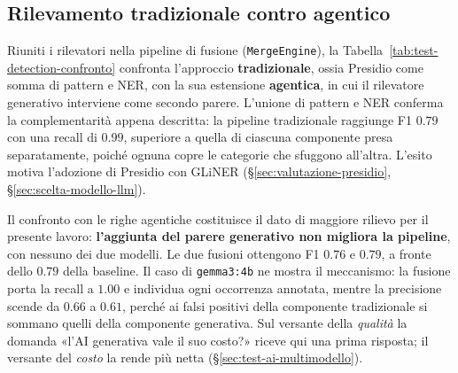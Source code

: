 \subsection{Rilevamento tradizionale contro agentico}
\label{sub:test-trad-vs-ai}

Riuniti i rilevatori nella pipeline di fusione (\texttt{MergeEngine}), la Tabella~\ref{tab:test-detection-confronto} confronta l'approccio \textbf{tradizionale}, ossia Presidio come somma di pattern e NER, con la sua estensione \textbf{agentica}, in cui il rilevatore generativo interviene come secondo parere. L'unione di pattern e NER conferma la complementarità appena descritta: la pipeline tradizionale raggiunge F1 $0.79$ con una recall di $0.99$, superiore a quella di ciascuna componente presa separatamente, poiché ognuna copre le categorie che sfuggono all'altra. L'esito motiva l'adozione di Presidio con GLiNER (§\ref{sec:valutazione-presidio}, §\ref{sec:scelta-modello-llm}).

Il confronto con le righe agentiche costituisce il dato di maggiore rilievo per il presente lavoro: \textbf{l'aggiunta del parere generativo non migliora la pipeline}, con nessuno dei due modelli. Le due fusioni ottengono F1 $0.76$ e $0.79$, a fronte dello $0.79$ della baseline. Il caso di \texttt{gemma3:4b} ne mostra il meccanismo: la fusione porta la recall a $1.00$ e individua ogni occorrenza annotata, mentre la precisione scende da $0.66$ a $0.61$, perché ai falsi positivi della componente tradizionale si sommano quelli della componente generativa. Sul versante della \emph{qualità} la domanda «l'AI generativa vale il suo costo?» riceve qui una prima risposta; il versante del \emph{costo} la rende più netta (§\ref{sec:test-ai-multimodello}).

